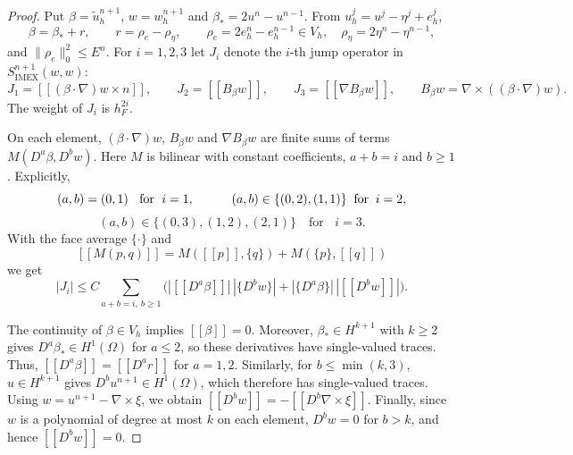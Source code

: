 \documentclass[11pt]{article}
\theoremstyle{remark}\newtheorem{remark}{Remark}
\newcommand{\Vh}{V_h}\newcommand{\Qh}{Q_h}
\newcommand{\tu}{\tilde u_h}
\newcommand{\Simex}{S_{\mathrm{IMEX}}}
\theoremstyle{plain}
\newcommand{\new}[1]{{\color{blue}#1}}
\begin{document}
\begin{proof}
Put $\beta=\tu^{n+1}$, $w=w_h^{n+1}$ and $\beta_*=2u^n-u^{n-1}$. From $u_h^j=u^j-\eta^j+e_h^j$,
\[
\beta=\beta_*+r,\qquad r=\rho_e-\rho_\eta,\qquad \rho_e=2e_h^n-e_h^{n-1}\in\Vh,\quad \rho_\eta=2\eta^n-\eta^{n-1},
\]
and $\|\rho_e\|_0^2\le E^n$. For $i=1,2,3$ let $J_i$ denote the $i$-th jump operator in $\Simex^{n+1}(w,w)$:
\[
J_1=[\![(\beta\cdot\nabla)w\times n]\!],\qquad J_2=[\![B_\beta w]\!],\qquad J_3=[\![\nabla B_\beta w]\!],
\qquad B_\beta w=\nabla\times((\beta\cdot\nabla)w).
\]
The weight of $J_i$ is $h_F^{2i}$.

On each element, $(\beta\cdot\nabla)w$, $B_\beta w$ and $\nabla B_\beta w$ are finite sums of terms $M(D^a\beta,D^bw)$. Here $M$ is bilinear with constant coefficients, $a+b=i$ and $b\ge1$. Explicitly, 
$$(a,b)=(0,1)\;\; \text{ for }\; i=1, \qquad\quad 
(a,b)\in\{(0,2),(1,1)\} \;\;\text{for\;\;} i=2,$$
$$
(a,b)\in\{(0,3),(1,2),(2,1)\} \quad \text{for }\;\; i=3.
$$
With the face average $\{\cdot\}$ and 
$$[\![M(p,q)]\!]=M([\![p]\!],\{q\})+M(\{p\},[\![q]\!])$$
we get 
\begin{equation}\label{eq:stab-structure}
|J_i|\le C\sum_{a+b=i,\ b\ge1}\Big(|[\![D^a\beta]\!]|\,|\{D^bw\}|+|\{D^a\beta\}|\,|[\![D^bw]\!]|\Big).
\end{equation}

The continuity of $\beta\in\Vh$ implies $[\![\beta]\!]=0$. \new{Moreover, $\beta_*\in H^{k+1}$ with $k\ge2$ gives $D^a\beta_*\in H^1(\Omega)$ for $a\le2$, so these derivatives have single-valued traces.} Thus, $[\![D^a\beta]\!]=[\![D^ar]\!]$ for $a=1,2$. Similarly, for $b\le\min(k,3)$, \new{$u\in H^{k+1}$ gives $D^bu^{n+1}\in H^1(\Omega)$, which therefore has single-valued traces.} Using $w=u^{n+1}-\nabla\times\xi$, we obtain $[\![D^bw]\!]=-[\![D^b\nabla\times\xi]\!]$. Finally, since $w$ is a polynomial of degree at most $k$ on each element, $D^bw=0$ for $b>k$, and hence $[\![D^bw]\!]=0$.


\end{proof}
\end{document}
